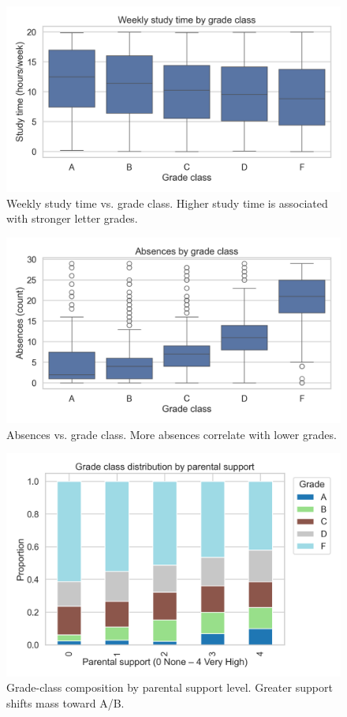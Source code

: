 \documentclass[11pt]{article}
\begin{document}
\begin{figure}[H]
	\centering
	\includegraphics[width=.9\textwidth]{figures/studytime_by_gradeclass.png}
	\caption{Weekly study time vs. grade class. Higher study time is associated with stronger letter grades.}\label{fig:studytime}
\end{figure}

\begin{figure}[H]
	\centering
	\includegraphics[width=.9\textwidth]{figures/absences_by_gradeclass.png}
	\caption{Absences vs. grade class. More absences correlate with lower grades.}\label{fig:absences}
\end{figure}

\begin{figure}[H]
	\centering
	\includegraphics[width=.9\textwidth]{figures/parental_support_vs_gradeclass.png}
	\caption{Grade-class composition by parental support level. Greater support shifts mass toward A/B.}\label{fig:parental-support}
\end{figure}
\end{document}
